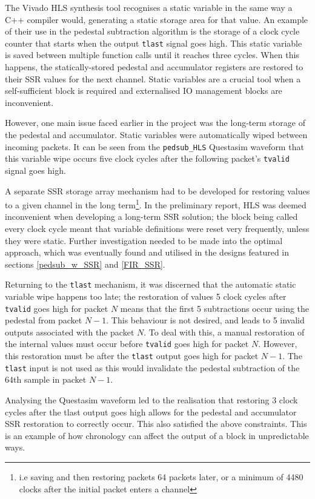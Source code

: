 \documentclass[10pt]{article}
\begin{document}
The Vivado HLS synthesis tool recognises a static variable in the same way a C++ compiler would, generating a static storage area for that value. An example of their use in the pedestal subtraction algorithm is the storage of a clock cycle counter that starts when the output \texttt{tlast} signal goes high. This static variable is saved between multiple function calls until it reaches three cycles. When this happens, the statically-stored pedestal and accumulator registers are restored to their SSR values for the next channel. Static variables are a crucial tool when a self-sufficient block is required and externalised IO management blocks are inconvenient.

However, one main issue faced earlier in the project was the long-term storage of the pedestal and accumulator. Static variables were automatically wiped between incoming packets. It can be seen from the \texttt{pedsub\_HLS} Questasim waveform that this variable wipe occurs five clock cycles after the following packet's \texttt{tvalid} signal goes high.

A separate SSR storage array mechanism had to be developed for restoring values to a given channel in the long term\footnote{i.e saving and then restoring packets 64 packets later, or a minimum of 4480 clocks after the initial packet enters a channel}. In the preliminary report, HLS was deemed inconvenient when developing a long-term SSR solution; the block being called every clock cycle meant that variable definitions were reset very frequently, unless they were static. Further investigation needed to be made into the optimal approach, which was eventually found and utilised in the designs featured in sections \ref{pedsub_w_SSR} and \ref{FIR_SSR}.

Returning to the \texttt{tlast} mechanism, it was discerned that the automatic static variable wipe happens too late; the restoration of values 5 clock cycles after \texttt{tvalid} goes high for packet $N$ means that the first 5 subtractions occur using the pedestal from packet $N - 1$. This behaviour is not desired, and leads to 5 invalid outputs associated with the packet $N$. To deal with this, a manual restoration of the internal values must occur before \texttt{tvalid} goes high for packet $N$. However, this restoration must be after the \texttt{tlast} output goes high for packet $N-1$. The \texttt{tlast} input is not used as this would invalidate the pedestal subtraction of the 64th sample in packet $N-1$.

Analysing the Questasim waveform led to the realisation that restoring 3 clock cycles after the tlast output goes high allows for the pedestal and accumulator SSR restoration to correctly occur. This also satisfied the above constraints. This is an example of how chronology can affect the output of a block in unpredictable ways.
\end{document}
